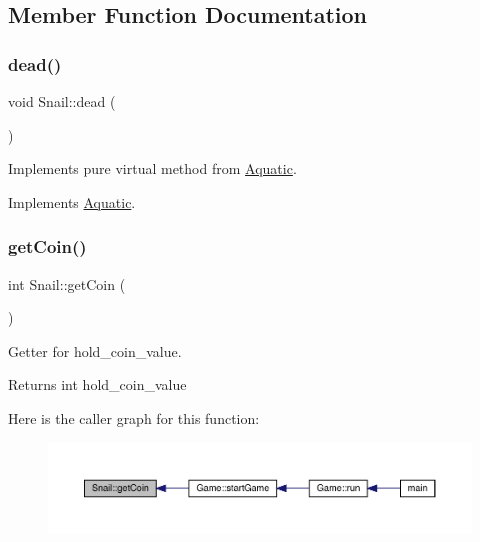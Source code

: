 \subsection{Member Function Documentation}
\mbox{\label{class_snail_ae80c3d27739aefd6d9c9078c4d17fcc3}} 
\subsubsection{\texorpdfstring{dead()}{dead()}}
{\footnotesize\ttfamily void Snail\+::dead (\begin{DoxyParamCaption}{ }\end{DoxyParamCaption})\hspace{0.3cm}{\ttfamily [virtual]}}



Implements pure virtual method from \mbox{\hyperlink{class_aquatic}{Aquatic}}. 



Implements \mbox{\hyperlink{class_aquatic_a22fdb11e9cfec922fe50638709768276}{Aquatic}}.

\mbox{\label{class_snail_a78405d7cca0e430a3adf51a8461fff68}} 
\subsubsection{\texorpdfstring{get\+Coin()}{getCoin()}}
{\footnotesize\ttfamily int Snail\+::get\+Coin (\begin{DoxyParamCaption}{ }\end{DoxyParamCaption})}



Getter for hold\+\_\+coin\+\_\+value. 

\begin{DoxyReturn}{Returns}
int hold\+\_\+coin\+\_\+value 
\end{DoxyReturn}
Here is the caller graph for this function\+:\nopagebreak
\begin{figure}[H]
\begin{center}
\leavevmode
\includegraphics[width=350pt]{class_snail_a78405d7cca0e430a3adf51a8461fff68_icgraph}
\end{center}
\end{figure}
\mbox{\label{class_snail_af5892ec122d9199480c813b74488256b}} 
